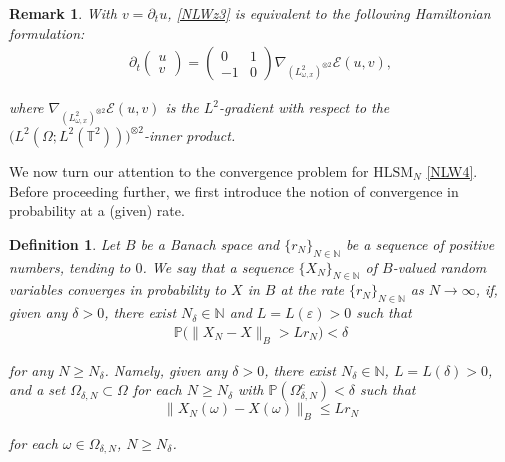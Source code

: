 \documentclass[letterpaper, 11pt,  reqno]{amsart}
\newtheorem{definition}[theorem]{Definition}
\newtheorem{remark}[theorem]{Remark}
\newcommand{\1}{\hspace{0.5mm}\text{I}\hspace{0.2mm}}
\newcommand{\noi}{\noindent}
\newcommand{\T}{\mathbb{T}}
\newcommand{\N}{\mathbb{N}}
\newcommand{\PP}{\mathbb{P}}
\newcommand{\eps}{\varepsilon}
\newcommand{\dl}{\delta}
\newcommand{\dt}{\partial_t}
\newcommand{\nb}{\nabla}
\newcommand{\EE}{\mathcal{E}}
\newcommand{\HLS}{$\text{HLSM}_N$ }
\renewcommand{\O}{\Omega}
\renewcommand{\o}{\omega}
\numberwithin{equation}{section}
\numberwithin{theorem}{section}
\begin{document}
\begin{remark}\rm 


With $v = \dt u $,  \eqref{NLWz3}
is equivalent to the following Hamiltonian formulation:
\begin{align*}
\dt \begin{pmatrix}
u  \\ v
\end{pmatrix}
= \begin{pmatrix}
0 & 1\\
- 1 & 0
\end{pmatrix}
\nb_{(L^2_{\o, x})^{\otimes 2}} \EE(u,v), 
\end{align*}

\noi
where 
$\nb_{(L^2_{\o, x})^{\otimes 2}}\EE(u, v)$ is the $L^2$-gradient
with respect to the $\big(L^2(\O; L^2(\T^2))\big)^{\otimes 2}$-inner product. 

\end{remark}







\medskip
We now turn our attention to the convergence problem
for \HLS \eqref{NLW4}.
Before proceeding further, 
we first introduce  the notion of convergence in probability at a (given)
rate.

\begin{definition}\label{DEF:conv1}
\rm 
Let $B$ be a Banach space
and $\{r_N\}_{N \in \N}$
be a sequence of positive numbers, 
tending to $0$.
We say that a sequence $\{ X_N\}_{N \in \N}$ of 
$B$-valued random variables converges
in probability to $X$ in $B$ at  the rate $\{r_N\}_{N \in \N}$
as $N \to \infty$,  
if, given any $\dl > 0$, there exist $N_\dl \in \N$ and  $L = L(\eps) > 0$
such that 
\begin{align}
\PP\Big(\| X_N - X\|_B > L r_N \Big) < \dl
\label{PR1}
\end{align}

\noi
for any $N \ge  N_\dl$.
Namely, given any $\dl > 0$, 
there exist 
$N_\dl \in \N$,
$L = L(\dl) > 0$, and a set $\O_{\dl, N} \subset \O$
for each $N \ge N_\dl$
with $\PP(\O_{\dl, N}^c) < \dl$
such that 
\[ \| X_N(\o) - X(\o) \|_B \le L r_N \]

\noi
for each $\o \in \O_{\dl, N}$, $N \ge N_\dl$.

\end{definition}
\end{document}
